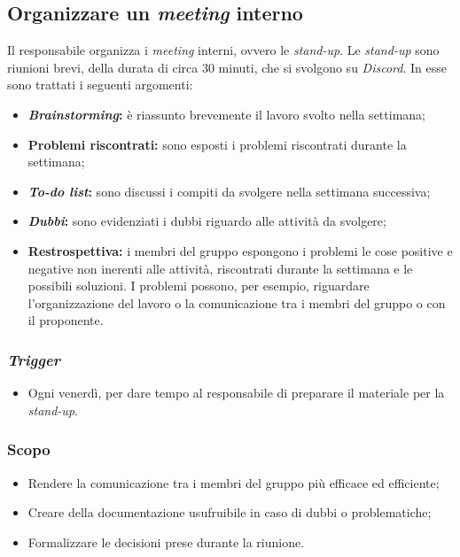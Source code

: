 \subsection{Organizzare un \textit{meeting} interno}
\label{organizzare-meeting-interno}

Il responsabile organizza i \textit{meeting} interni, ovvero le
\textit{stand-up}. Le \textit{stand-up} sono riunioni brevi, della durata di
circa 30 minuti, che si svolgono su \textit{Discord}\g. In esse sono trattati i
seguenti argomenti:
\begin{itemize}
	\item \textbf{\textit{Brainstorming}:} è riassunto brevemente il lavoro
	      svolto nella settimana;

	\item \textbf{Problemi riscontrati:} sono esposti i problemi riscontrati
	      durante la settimana;

	\item \textbf{\textit{To-do list}:} sono discussi i compiti da svolgere nella
	      settimana successiva;

	\item \textbf{\textit{Dubbi}:} sono evidenziati i dubbi riguardo alle
	      attività da svolgere;

	\item \textbf{Restrospettiva:} i membri del gruppo espongono i problemi le
	      cose positive e negative non inerenti alle attività, riscontrati
	      durante la settimana e le possibili soluzioni. I problemi possono, per
	      esempio, riguardare l'organizzazione del lavoro o la comunicazione tra
	      i membri del gruppo o con il proponente.
\end{itemize}

\subsubsection{\textit{Trigger}}
\begin{itemize}
	\item Ogni venerdì, per dare tempo al responsabile di preparare il materiale
	      per la \textit{stand-up}.
\end{itemize}

\subsubsection{Scopo}
\begin{itemize}
	\item Rendere la comunicazione tra i membri del gruppo più efficace ed
	      efficiente;

	\item Creare della documentazione usufruibile in caso di dubbi o
	      problematiche;

	\item Formalizzare le decisioni prese durante la riunione.
\end{itemize}

